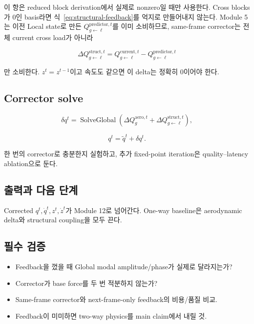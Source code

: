 \documentclass[11pt,a4paper]{article}
\begin{document}
이 항은 reduced block derivation에서 실제로 nonzero일 때만 사용한다.
Cross blocks가 0인 basis라면 식~\eqref{eq:structural-feedback}를 억지로 만들어내지 않는다.
Module 5는 이전 Local state로 만든
\(Q_{g\leftarrow\ell}^{\mathrm{predictor},t}\)를 이미 소비하므로,
same-frame corrector는 전체 current cross load가 아니라

\begin{equation}
  \Delta Q_{g\leftarrow\ell}^{\mathrm{struct},t}
  =
  Q_{g\leftarrow\ell}^{\mathrm{current},t}
  -Q_{g\leftarrow\ell}^{\mathrm{predictor},t}
\end{equation}

만 소비한다. \(z^t=z^{t-1}\)이고 속도도 같으면 이 delta는 정확히 0이어야 한다.

\subsection*{Corrector solve}

\begin{equation}
  \delta q^t
  =
  \operatorname{SolveGlobal}
  \left(
  \Delta Q_g^{\mathrm{aero},t}
  +\Delta Q_{g\leftarrow\ell}^{\mathrm{struct},t}
  \right),
\end{equation}

\begin{equation}
  q^t=\widetilde q^t+\delta q^t.
\end{equation}

한 번의 corrector로 충분한지 실험하고,
추가 fixed-point iteration은 quality--latency ablation으로 둔다.

\subsection*{출력과 다음 단계}

Corrected \(q^t,\dot q^t,z^t,\dot z^t\)가 Module 12로 넘어간다.
One-way baseline은 aerodynamic delta와 structural coupling을 모두 끈다.

\subsection*{필수 검증}

\begin{itemize}[leftmargin=1.5em]
  \item Feedback을 껐을 때 Global modal amplitude/phase가 실제로 달라지는가?
  \item Corrector가 base force를 두 번 적분하지 않는가?
  \item Same-frame corrector와 next-frame-only feedback의 비용/품질 비교.
  \item Feedback이 미미하면 two-way physics를 main claim에서 내릴 것.
\end{itemize}
\end{document}
